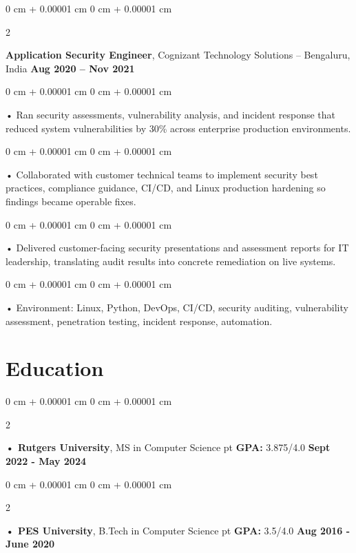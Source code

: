 \documentclass[10pt, letterpaper]{article}
\newenvironment{onecolentry}{
    \begin{adjustwidth}{
        0 cm + 0.00001 cm
    }{
        0 cm + 0.00001 cm
    }
}{
    \end{adjustwidth}
} %
\newenvironment{twocolentry}[2][]{
    \onecolentry
    \def\secondColumn{#2}
    \setcolumnwidth{\fill, 4.5 cm}
    \begin{paracol}{2}
}{
    \switchcolumn \raggedleft \secondColumn
    \end{paracol}
    \endonecolentry
} %
\begin{document}
        \begin{twocolentry}{
            \textbf{Aug 2020 – Nov 2021}
        }
            \vspace{2 pt }
            \textbf{Application Security Engineer}, Cognizant Technology Solutions -- Bengaluru, India\end{twocolentry}
        \begin{onecolentry}
             • Ran security assessments, vulnerability analysis, and incident response that reduced system vulnerabilities by 30\% across enterprise production environments.
        \end{onecolentry}
        \begin{onecolentry}
             • Collaborated with customer technical teams to implement security best practices, compliance guidance, CI/CD, and Linux production hardening so findings became operable fixes.
        \end{onecolentry}
        \begin{onecolentry}
             • Delivered customer-facing security presentations and assessment reports for IT leadership, translating audit results into concrete remediation on live systems.
        \end{onecolentry}
        \begin{onecolentry}
             • Environment: Linux, Python, DevOps, CI/CD, security auditing, vulnerability assessment, penetration testing, incident response, automation.
        \end{onecolentry}
    \vspace{2 pt }
        \section{Education}
        \vspace{2 pt }
        \begin{twocolentry}{
            \textbf{Sept 2022 - May 2024}
        }
            \textbf{ • Rutgers University}, MS in Computer Science  pt \textbf{GPA:} 3.875/4.0  \end{twocolentry}

        \begin{twocolentry}{
            \textbf{Aug 2016 - June 2020}
        }
            \textbf{ • PES University}, B.Tech in Computer Science  pt \textbf{GPA:} 3.5/4.0  \end{twocolentry}

    \vspace{0.4cm}
\end{document}
